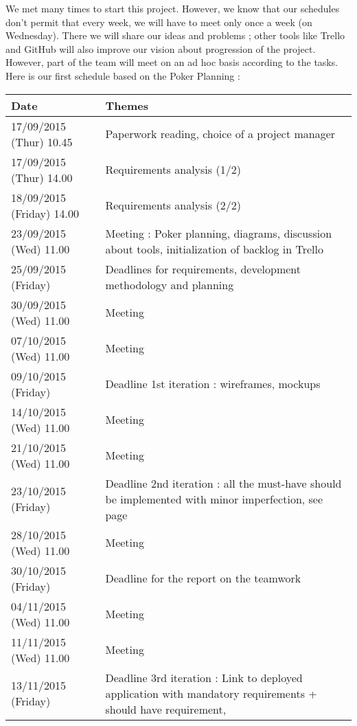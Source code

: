 We met many times to start this project. However, we know that our
schedules don't permit that every week, we will have to meet only once a
week (on Wednesday). There we will share our ideas and problems ;
other tools like Trello and GitHub will also improve our vision about
progression of the project. However, part of the team will meet on an ad
hoc basis according to the tasks. Here is our first schedule based on
the Poker Planning : \newline

\noindent\begin{longtable}{|p{0.275\linewidth}|p{0.725\linewidth}|}
    \hline
    Date & Themes \\
    \hline
    \hline
    17/09/2015 (Thur) 10.45 & Paperwork reading, choice of a project
    manager \\
    \hline
    17/09/2015 (Thur) 14.00 & Requirements analysis (1/2) \\
    \hline
    18/09/2015 (Friday) 14.00 & Requirements analysis (2/2) \\
    \hline
    23/09/2015 (Wed) 11.00 & Meeting : Poker planning, diagrams,
    discussion about tools, initialization of backlog in Trello \\
    \hline
    25/09/2015 (Friday) & Deadlines for requirements, development methodology
    and planning \\
    \hline
    30/09/2015 (Wed) 11.00 & Meeting \\
    \hline
    07/10/2015 (Wed) 11.00 & Meeting \\
    \hline
    09/10/2015 (Friday) & Deadline 1st iteration : wireframes, mockups \\
    \hline
    14/10/2015 (Wed) 11.00 & Meeting \\
    \hline
    21/10/2015 (Wed) 11.00 & Meeting \\
    \hline
    23/10/2015 (Friday) & Deadline 2nd iteration : all the must-have
    should be implemented with minor imperfection, see
    page~\pageref{musthave} \\
    \hline
    28/10/2015 (Wed) 11.00 & Meeting \\
    \hline
    30/10/2015 (Friday) & Deadline for the report on the teamwork \\
    \hline
    04/11/2015 (Wed) 11.00 & Meeting \\
    \hline
    11/11/2015 (Wed) 11.00 & Meeting \\
    \hline
    13/11/2015 (Friday) & Deadline 3rd iteration : Link to deployed
    application with mandatory requirements + should have requirement,

\end{longtable}
